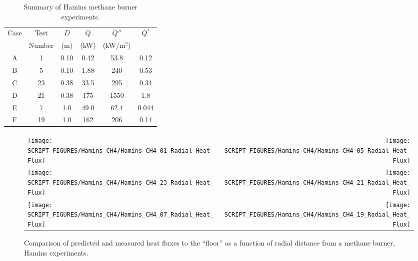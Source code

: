 \begin{table}[ht]
\caption{Summary of Hamins methane burner experiments. }
\begin{center}
\begin{tabular}{|c|c|c|c|c|c|}
\hline
Case     & Test     & $D$  & $\dot{Q}$   &  $\dot{Q}''$   & $Q^*$   \\
         & Number   & (m)  & (kW)        &  (kW/m$^2$)    &         \\ \hline \hline
A        & 1        & 0.10 & 0.42        &  53.8          & 0.12    \\ \hline
B        & 5        & 0.10 & 1.88        &  240           & 0.53    \\ \hline
C        & 23       & 0.38 & 33.5        &  295           & 0.34    \\ \hline
D        & 21       & 0.38 & 175         &  1550          & 1.8     \\ \hline
E        & 7        & 1.0  & 49.0        &  62.4          & 0.044   \\ \hline
F        & 19       & 1.0  & 162         &  206           & 0.14    \\ \hline
\end{tabular}
\end{center}
\label{Hamins_Table}
\end{table}

\newpage

\begin{figure}[p]
\begin{tabular*}{\textwidth}{l@{\extracolsep{\fill}}r}
\texttt{[image: SCRIPT\_FIGURES/Hamins\_CH4/Hamins\_CH4\_01\_Radial\_Heat\_Flux]} &
\texttt{[image: SCRIPT\_FIGURES/Hamins\_CH4/Hamins\_CH4\_05\_Radial\_Heat\_Flux]} \\
\texttt{[image: SCRIPT\_FIGURES/Hamins\_CH4/Hamins\_CH4\_23\_Radial\_Heat\_Flux]} &
\texttt{[image: SCRIPT\_FIGURES/Hamins\_CH4/Hamins\_CH4\_21\_Radial\_Heat\_Flux]} \\
\texttt{[image: SCRIPT\_FIGURES/Hamins\_CH4/Hamins\_CH4\_07\_Radial\_Heat\_Flux]} &
\texttt{[image: SCRIPT\_FIGURES/Hamins\_CH4/Hamins\_CH4\_19\_Radial\_Heat\_Flux]}
\end{tabular*}
\label{Hamins_CH4_Radial}
\caption[Radial heat flux predictions, Hamins methane burner experiments.]
{Comparison of predicted and measured heat fluxes to the ``floor'' as a function of radial distance from a methane burner, Hamins experiments.}
\end{figure}


